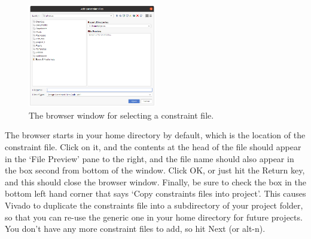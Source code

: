 \documentclass[../physical_computing.tex]{subfiles}
\begin{document}
\begin{figure}[htbp]
    \centering
    \includegraphics[width=0.5\textwidth]{figures/add_constraint_file.png}
    \caption{The browser window for selecting a constraint file.}
    \label{fig:add_constraint_file}
\end{figure}

The browser starts in your home directory by default, which is the location of the constraint file. Click on it, and the contents at the head of the file should appear in the `File Preview' pane to the right, and the file name should also appear in the box second from bottom of the window. Click OK, or just hit the Return key, and this should close the browser window. Finally, be sure to check the box in the bottom left hand corner that says `Copy constraints files into project'. This causes Vivado to duplicate the constraints file into a subdirectory of your project folder, so that you can re-use the generic one in your home directory for future projects. You don't have any more constraint files to add, so hit Next (or alt-n).
\end{document}
